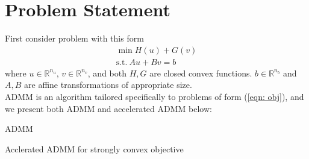 \documentclass[11pt]{article}
\theoremstyle{plain}
\theoremstyle{definition}
\theoremstyle{remark}
\begin{document}
\section{Problem Statement}
\label{sec: problem_statement}
First consider problem with this form
\begin{equation}
    \begin{aligned}
    \min H(u) + G(v) \\
    \text{s.t.} \ Au + Bv = b
    \end{aligned}
    \label{eqn: obj}
\end{equation}
where $u \in \mathbb{R}^{n_u}$, $v \in \mathbb{R}^{n_v}$, and both $H, G$ are closed convex functions. $b \in \mathbb{R}^{n_b}$ and $A,B$ are affine transformations of appropriate size.\\
ADMM is an algorithm tailored specifically to problems of form (\ref{eqn: obj}), and we present both ADMM and accelerated ADMM below:

\begin{algorithm}

    \caption{ADMM}
\end{algorithm}

\begin{algorithm}

    \caption{Acclerated ADMM for strongly convex objective}
\end{algorithm}
\end{document}
